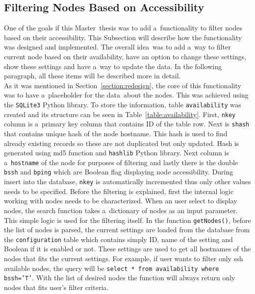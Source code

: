 {{{{\subsection{Filtering Nodes Based on Accessibility}
One of the goals if this Master~thesis was to add a~functionality to filter nodes based on their accessibility. This Subsection will describe how the functionality was designed and implemented. The overall idea~was to add a~way to filter current node based on their availability, have an option to change these settings, show these settings and have a~way to update the data. In the following paragraph, all these items will be described more in detail.\\
As it was mentioned in Section~\ref{section:redesign}, the core of this functionality was to have a~placeholder for the data~about the nodes. This was achieved using the \texttt{SQLite3} Python library. To store the information, table \texttt{availability} was created and its structure can be seen in Table~\ref{table:availability}. First, \texttt{nkey} column is a~primary key column that contains ID of the table row. Next is \texttt{shash} that contains unique hash of the node hostname. This hash is used to find already existing records so these are not duplicated but only updated. Hash is generated using md5 function and \texttt{hashlib} Python library. Next column is a~\texttt{hostname} of the node for purposes of filtering and lastly there is the double \texttt{bssh} and \texttt{bping} which are Boolean flag displaying node accessibility. During insert into the database, \texttt{nkey} is automatically incremented thus only other values needs to be specified. Before the filtering is explained, first the internal logic working with nodes needs to be characterized. When an user select to display nodes, the search function takes a~dictionary of nodes as an input parameter. This simple logic is used for the filtering itself. In the function \texttt{getNodes()}, before the list of nodes is parsed, the current settings are loaded from the database from the \texttt{configuration} table which contains simply ID, name of the setting and Boolean if it is enabled or not. These settings are used to get all hostnames of the nodes that fits the current settings. For example, if user wants to filter only ssh available nodes, the query will be \texttt{select * from availability where bssh='T'}. With the list of desired nodes the function will always return only nodes that fits user's filter criteria.\\

}}}}
